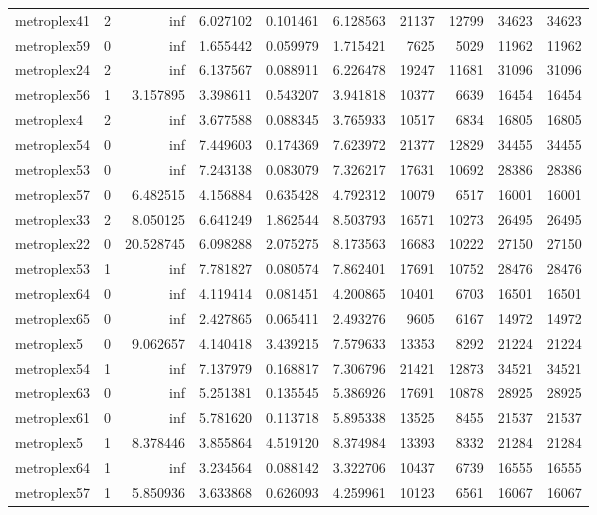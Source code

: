 \begin{longtable}{|l|r|r|r|r|r|r|r|r|r|}
metroplex41 & 2 & inf & 6.027102 & 0.101461 & 6.128563 & 21137 & 12799 & 34623 & 34623 \\
metroplex59 & 0 & inf & 1.655442 & 0.059979 & 1.715421 & 7625 & 5029 & 11962 & 11962 \\
metroplex24 & 2 & inf & 6.137567 & 0.088911 & 6.226478 & 19247 & 11681 & 31096 & 31096 \\
metroplex56 & 1 & 3.157895 & 3.398611 & 0.543207 & 3.941818 & 10377 & 6639 & 16454 & 16454 \\
metroplex4 & 2 & inf & 3.677588 & 0.088345 & 3.765933 & 10517 & 6834 & 16805 & 16805 \\
metroplex54 & 0 & inf & 7.449603 & 0.174369 & 7.623972 & 21377 & 12829 & 34455 & 34455 \\
metroplex53 & 0 & inf & 7.243138 & 0.083079 & 7.326217 & 17631 & 10692 & 28386 & 28386 \\
metroplex57 & 0 & 6.482515 & 4.156884 & 0.635428 & 4.792312 & 10079 & 6517 & 16001 & 16001 \\
metroplex33 & 2 & 8.050125 & 6.641249 & 1.862544 & 8.503793 & 16571 & 10273 & 26495 & 26495 \\
metroplex22 & 0 & 20.528745 & 6.098288 & 2.075275 & 8.173563 & 16683 & 10222 & 27150 & 27150 \\
metroplex53 & 1 & inf & 7.781827 & 0.080574 & 7.862401 & 17691 & 10752 & 28476 & 28476 \\
metroplex64 & 0 & inf & 4.119414 & 0.081451 & 4.200865 & 10401 & 6703 & 16501 & 16501 \\
metroplex65 & 0 & inf & 2.427865 & 0.065411 & 2.493276 & 9605 & 6167 & 14972 & 14972 \\
metroplex5 & 0 & 9.062657 & 4.140418 & 3.439215 & 7.579633 & 13353 & 8292 & 21224 & 21224 \\
metroplex54 & 1 & inf & 7.137979 & 0.168817 & 7.306796 & 21421 & 12873 & 34521 & 34521 \\
metroplex63 & 0 & inf & 5.251381 & 0.135545 & 5.386926 & 17691 & 10878 & 28925 & 28925 \\
metroplex61 & 0 & inf & 5.781620 & 0.113718 & 5.895338 & 13525 & 8455 & 21537 & 21537 \\
metroplex5 & 1 & 8.378446 & 3.855864 & 4.519120 & 8.374984 & 13393 & 8332 & 21284 & 21284 \\
metroplex64 & 1 & inf & 3.234564 & 0.088142 & 3.322706 & 10437 & 6739 & 16555 & 16555 \\
metroplex57 & 1 & 5.850936 & 3.633868 & 0.626093 & 4.259961 & 10123 & 6561 & 16067 & 16067 \\

\end{longtable}
